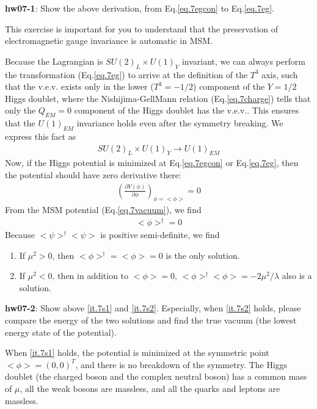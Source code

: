 \documentclass[12pt]{article}
\def\del{{\partial}}
\begin{document}
{\bf hw07-1}: Show the above derivation, from Eq.\ref{eq.7egcon} to Eq.\ref{eq.7eg}.

  This exercise is important for you to understand that the
  preservation of electromagnetic gauge invariance is automatic
  in MSM.

  Because the Lagrangian is $SU(2)_L \times U(1)_Y$ invariant,
  we can always perform the transformation (Eq.\ref{eq.7eg}) to arrive at
  the definition of the $T^3$ axis, such that the v.e.v. exists
  only in the lower ($T^3 = -1/2$) component of the $Y=1/2$ Higgs
  doublet, where the Nishijima-GellMann relation (Eq.\ref{eq.7charge}) tells
  that only the $Q_{EM}=0$ component of the Higgs doublet has
  the v.e.v..  This ensures that the $U(1)_{EM}$ invariance holds
  even after the symmetry breaking.  We express this fact as
\begin{eqnarray}
  SU(2)_L \times U(1)_Y  \to  U(1)_{EM}
\end{eqnarray}
    Now, if the Higgs potential is minimized at Eq.\ref{eq.7egcon} or Eq.\ref{eq.7eg}, then the potential should have zero derivative there:
\begin{eqnarray}
\left (\frac{\del V(\phi)}{\del \phi} \right )_{ \phi = <\phi>} = 0 \label{eq.7pd}
\end{eqnarray}
  From the MSM potential (Eq.\ref{eq.7vacuum}), we find
\begin{eqnarray}
  [\frac{\lambda}{2} (<\phi>^\dagger <\phi>) + \mu^2] <\phi>^\dagger = 0
\end{eqnarray}
  Because $<\psi>^\dagger <\psi>$ is positive semi-definite,
  we find
  \begin{enumerate}
    \item If $\mu^2 > 0$, then $<\phi>^\dagger = <\phi> = 0$
    is the only solution. \label{it.7s1}
    \item If $\mu^2 < 0$, then in addition to $<\phi> = 0$,
    $<\phi>^\dagger <\phi> = -2\mu^2/\lambda$ also is a solution. \label{it.7s2}
  \end{enumerate}


{\bf hw07-2}: Show above \ref{it.7s1} and \ref{it.7s2}.  Especially, when \ref{it.7s2} holds, please compare the energy of the two solutions and find the true vacuum (the lowest energy state of the potential).

  When \ref{it.7s1} holds, the potential is minimized at the symmetric
  point $<\phi> = ( 0, 0 )^T$, and there is no breakdown of the
  symmetry.  The Higgs doublet (the charged boson and the complex
  neutral boson) has a common mass of $\mu$, all the weak bosons
  are massless, and all the quarks and leptons are massless.
\end{document}

